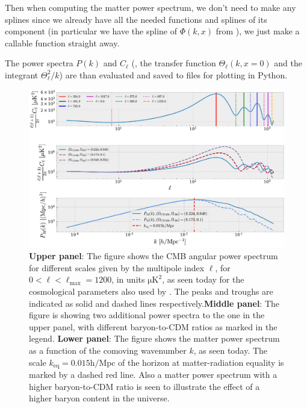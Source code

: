 \documentclass[twocolumn]{aastex62}
\begin{document}
Then when computing the matter power spectrum, we don't need to make any splines since we already have all the needed functions and splines of its component (in particular we have the spline of $\Phi(k, x)$ from \cite{stutzer:2020c}), we just make a callable function straight away. 

The power spectra $P(k)$ and $C_\ell$ (, the transfer function $\Theta_\ell(k, x = 0)$ and the integrant $\Theta_\ell^2 / k$) are than evaluated and saved to files for plotting in Python.

\begin{figure}
    \includegraphics[scale = 0.65]{Figures/Cell.pdf}
    \caption{\textbf{Upper panel}: The figure shows the CMB angular power spectrum for different scales given by the multipole index $\ell$, for $0 < \ell < \ell_\text{max} = 1200$, in units $\mathrm{\mu K}^2$, as seen today for the cosmological parameters also used by \cite{stutzer:2020a,stutzer:2020b,stutzer:2020c}. The peaks and troughs are indicated as solid and dashed lines respectively.\textbf{Middle panel}: The figure is showing two additional power spectra to the one in the upper panel, with different baryon-to-CDM ratios as marked in the legend.  \textbf{Lower panel}: The figure shows the matter power spectrum as a function of the comoving wavenumber $k$, as seen today. The scale $k_\text{eq} = 0.015 \mathrm{h / Mpc}$ of the horizon at matter-radiation equality is marked by a dashed red line. Also a matter power spectrum with a higher baryon-to-CDM ratio is seen to illustrate the effect of a higher baryon content in the universe.} 
    \label{fig:Cell}
\end{figure}
\end{document}
